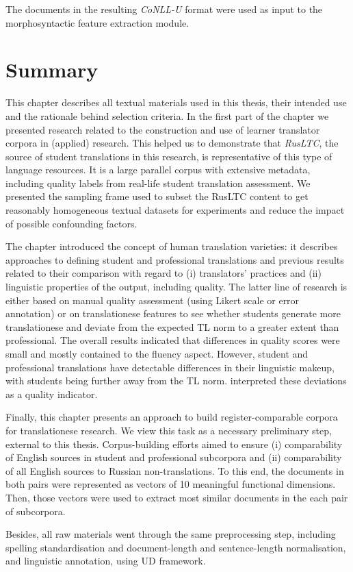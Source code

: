 The documents in the resulting \textit{CoNLL-U} format were used as input to the morphosyntactic feature extraction module. 

\section{\label{sec:sum3}Summary} 
This chapter describes all textual materials used in this thesis, their intended use and the rationale behind selection criteria.
In the first part of the chapter we presented research related to the construction and use of learner translator corpora in (applied) research. This helped us to demonstrate that \textit{RusLTC}, the source of student translations in this research, is representative of this type of language resources. It is a large parallel corpus with extensive metadata, including quality labels from real-life student translation assessment. We presented the sampling frame used to subset the RusLTC content to get reasonably homogeneous textual datasets for experiments and reduce the impact of possible confounding factors. 

The chapter introduced the concept of human translation varieties: it describes approaches to defining student and professional translations and previous results related to their comparison with regard to (i) translators' practices and (ii) linguistic properties of the output, including quality. The latter line of research is either based on manual quality assessment (using Likert scale or error annotation) or on translationese features to see whether students generate more translationese and deviate from the expected TL norm to a greater extent than professional. The overall results indicated that differences in quality scores were small and mostly contained to the fluency aspect. However, student and professional translations have detectable differences in their linguistic makeup, with students being further away from the TL norm. \citet{Sutter2017} interpreted these deviations as a quality indicator. 

Finally, this chapter presents an approach to build register-comparable corpora for translationese research. We view this task as a necessary preliminary step, external to this thesis. Corpus-building efforts aimed to ensure (i) comparability of English sources in student and professional subcorpora and (ii) comparability of all English sources to Russian non-translations. To this end, the documents in both pairs were represented as vectors of 10 meaningful functional dimensions. Then, those vectors were used to extract most similar documents in the each pair of subcorpora.

Besides, all raw materials went through the same preprocessing step, including spelling standardisation and document-length and sentence-length normalisation, and linguistic annotation, using UD framework.